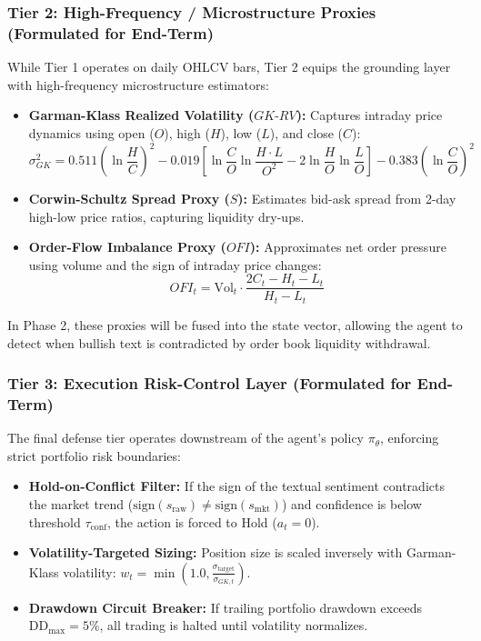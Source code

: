 \documentclass[11pt,a4paper]{article}
\begin{document}
\subsubsection{Tier 2: High-Frequency / Microstructure Proxies (Formulated for End-Term)}
While Tier 1 operates on daily OHLCV bars, Tier 2 equips the grounding layer with high-frequency microstructure estimators:
\begin{itemize}
    \item \textbf{Garman-Klass Realized Volatility ($GK\text{-}RV$):} Captures intraday price dynamics using open ($O$), high ($H$), low ($L$), and close ($C$):
    \begin{equation}
        \sigma_{GK}^2 = 0.511 \left(\ln \frac{H}{C}\right)^2 - 0.019 \left[\ln \frac{C}{O} \ln \frac{H \cdot L}{O^2} - 2 \ln \frac{H}{O} \ln \frac{L}{O}\right] - 0.383 \left(\ln \frac{C}{O}\right)^2
    \end{equation}
    \item \textbf{Corwin-Schultz Spread Proxy ($S$):} Estimates bid-ask spread from 2-day high-low price ratios, capturing liquidity dry-ups.
    \item \textbf{Order-Flow Imbalance Proxy ($OFI$):} Approximates net order pressure using volume and the sign of intraday price changes:
    \begin{equation}
        OFI_t = \text{Vol}_t \cdot \frac{2 C_t - H_t - L_t}{H_t - L_t}
    \end{equation}
\end{itemize}
In Phase 2, these proxies will be fused into the state vector, allowing the agent to detect when bullish text is contradicted by order book liquidity withdrawal.

\subsubsection{Tier 3: Execution Risk-Control Layer (Formulated for End-Term)}
The final defense tier operates downstream of the agent's policy $\pi_\theta$, enforcing strict portfolio risk boundaries:
\begin{itemize}
    \item \textbf{Hold-on-Conflict Filter:} If the sign of the textual sentiment contradicts the market trend ($\text{sign}(s_{\text{raw}}) \ne \text{sign}(s_{\text{mkt}})$) and confidence is below threshold $\tau_{\text{conf}}$, the action is forced to Hold ($a_t = 0$).
    \item \textbf{Volatility-Targeted Sizing:} Position size is scaled inversely with Garman-Klass volatility: $w_t = \min\left(1.0, \frac{\sigma_{\text{target}}}{\sigma_{GK, t}}\right)$.
    \item \textbf{Drawdown Circuit Breaker:} If trailing portfolio drawdown exceeds $\text{DD}_{\text{max}} = 5\%$, all trading is halted until volatility normalizes.
\end{itemize}
\end{document}
